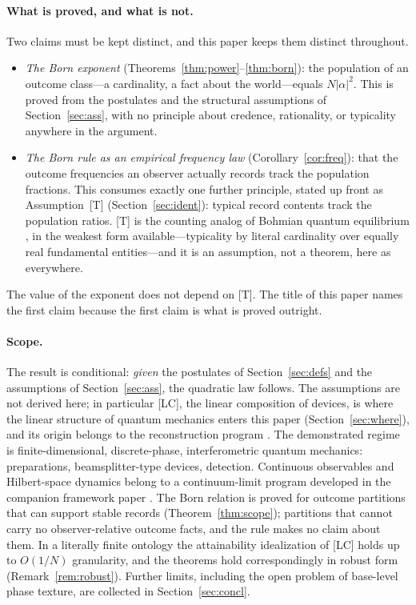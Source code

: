 \documentclass[11pt]{article}
\theoremstyle{definition}
\theoremstyle{remark}
\begin{document}
\paragraph{What is proved, and what is not.}
Two claims must be kept distinct, and this paper keeps them distinct throughout.
\begin{itemize}
\item \emph{The Born exponent} (Theorems~\ref{thm:power}--\ref{thm:born}): the population of an outcome class---a cardinality, a fact about the world---equals $N|\alpha|^2$. This is proved from the postulates and the structural assumptions of Section~\ref{sec:ass}, with no principle about credence, rationality, or typicality anywhere in the argument.
\item \emph{The Born rule as an empirical frequency law} (Corollary~\ref{cor:freq}): that the outcome frequencies an observer actually records track the population fractions. This consumes exactly one further principle, stated up front as Assumption~[T] (Section~\ref{sec:ident}): typical record contents track the population ratios. [T] is the counting analog of Bohmian quantum equilibrium \cite{Durr1992}, in the weakest form available---typicality by literal cardinality over equally real fundamental entities---and it is an assumption, not a theorem, here as everywhere.
\end{itemize}
The value of the exponent does not depend on [T]. The title of this paper names the first claim because the first claim is what is proved outright.

\paragraph{Scope.}
The result is conditional: \emph{given} the postulates of Section~\ref{sec:defs} and the assumptions of Section~\ref{sec:ass}, the quadratic law follows. The assumptions are not derived here; in particular [LC], the linear composition of devices, is where the linear structure of quantum mechanics enters this paper (Section~\ref{sec:where}), and its origin belongs to the reconstruction program \cite{Hardy2001,CDP2011,MasanesMuller2011}. The demonstrated regime is finite-dimensional, discrete-phase, interferometric quantum mechanics: preparations, beamsplitter-type devices, detection. Continuous observables and Hilbert-space dynamics belong to a continuum-limit program developed in the companion framework paper \cite{TillittCR}. The Born relation is proved for outcome partitions that can support stable records (Theorem~\ref{thm:scope}); partitions that cannot carry no observer-relative outcome facts, and the rule makes no claim about them. In a literally finite ontology the attainability idealization of [LC] holds up to $O(1/N)$ granularity, and the theorems hold correspondingly in robust form (Remark~\ref{rem:robust}). Further limits, including the open problem of base-level phase texture, are collected in Section~\ref{sec:concl}.
\end{document}
